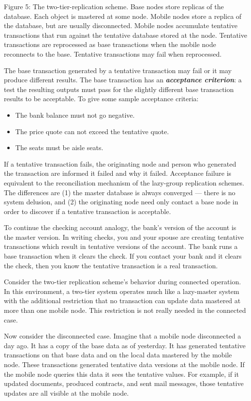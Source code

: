 \documentclass[a4paper,12pt,twoside,openright]{article}
\begin{document}
Figure 5: The two-tier-replication scheme. Base nodes store replicas of
the database. Each object is mastered at some node. Mobile nodes store a
replica of the database, but are usually disconnected. Mobile nodes
accumulate tentative transactions that run against the tentative
database stored at the node. Tentative transactions are reprocessed as
base transactions when the mobile node reconnects to the base. Tentative
transactions may fail when reprocessed.

The base transaction generated by a tentative transaction may fail or it
may produce different results. The base transaction has an
\emph{\textbf{acceptance criterion}}: a test the resulting outputs must
pass for the slightly different base transaction results to be
acceptable. To give some sample acceptance criteria:

\begin{itemize}
\item
  The bank balance must not go negative.
\item
  The price quote can not exceed the tentative quote.
\item
  The seats must be aisle seats.
\end{itemize}

If a tentative transaction fails, the originating node and person who
generated the transaction are informed it failed and why it failed.
Acceptance failure is equivalent to the reconciliation mechanism of the
lazy-group replication schemes. The differences are (1) the master
database is always converged --- there is no system delusion, and (2)
the originating node need only contact a base node in order to discover
if a tentative transaction is acceptable.

To continue the checking account analogy, the bank's version of the
account is the master version. In writing checks, you and your spouse
are creating tentative transactions which result in tentative versions
of the account. The bank runs a base transaction when it clears the
check. If you contact your bank and it clears the check, then you know
the tentative transaction is a real transaction.

Consider the two-tier replication scheme's behavior during connected
operation. In this environment, a two-tier system operates much like a
lazy-master system with the additional restriction that no transaction
can update data mastered at more than one mobile node. This restriction
is not really needed in the connected case.

Now consider the disconnected case. Imagine that a mobile node
disconnected a day ago. It has a copy of the base data as of yesterday.
It has generated tentative transactions on that base data and on the
local data mastered by the mobile node. These transactions generated
tentative data versions at the mobile node. If the mobile node queries
this data it sees the tentative values. For example, if it updated
documents, produced contracts, and sent mail messages, those tentative
updates are all visible at the mobile node.
\end{document}
